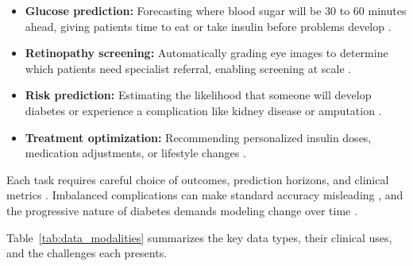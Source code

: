 \begin{itemize}
    \item \textbf{Glucose prediction:} Forecasting where blood sugar will be 30 to 60 minutes ahead, giving patients time to eat or take insulin before problems develop \cite{jacobs2023artificial, prioleau2025deep}.
    \item \textbf{Retinopathy screening:} Automatically grading eye images to determine which patients need specialist referral, enabling screening at scale \cite{zhang2025systematic, zhu2021deep}.
    \item \textbf{Risk prediction:} Estimating the likelihood that someone will develop diabetes or experience a complication like kidney disease or amputation \cite{oikonomou2023machine, wang2024ai}.
    \item \textbf{Treatment optimization:} Recommending personalized insulin doses, medication adjustments, or lifestyle changes \cite{mackenzie2023diabetes, contreras2018artificial}.
\end{itemize}

Each task requires careful choice of outcomes, prediction horizons, and clinical metrics \cite{jacobs2023artificial}. Imbalanced complications can make standard accuracy misleading \cite{alam2024machine}, and the progressive nature of diabetes demands modeling change over time \cite{zhu2021deep}.

Table~\ref{tab:data_modalities} summarizes the key data types, their clinical uses, and the challenges each presents.

